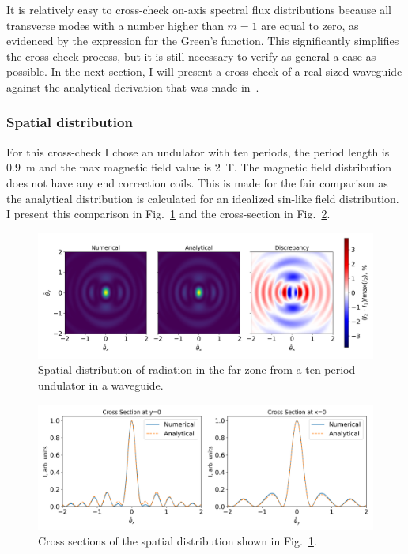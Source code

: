     It is relatively easy to cross-check on-axis spectral flux distributions because all transverse modes with a number higher than $m=1$ are equal to zero, as evidenced by the expression for the Green's function. This significantly simplifies the cross-check process, but it is still necessary to verify as general a case as possible. In the next section, I will present a cross-check of a real-sized waveguide against the analytical derivation that was made in~.
    
\subsubsection{Spatial distribution}
    For this cross-check I chose an undulator with ten periods, the period length is $0.9$~m and the max magnetic field value is $2$~T. The magnetic field distribution does not have any end correction coils. This is made for the fair comparison as the analytical distribution is calculated for an idealized sin-like field distribution. I present this comparison in Fig.~\ref{Fig:pipe_check_2D} and the cross-section in Fig.~\ref{Fig:pipe_check_1D}.
    \begin{figure}[p]
    	\centering
        \includegraphics[width=0.99\linewidth]{content/images/5_THz_Source/pipe_check_2D.png}
        \captionsetup{justification=centering}
        \caption{Spatial distribution of radiation in the far zone from a ten period undulator in a waveguide.}
        \label{Fig:pipe_check_2D}
    \end{figure}
    \begin{figure}[p]
    	\centering
        \includegraphics[width=0.99\linewidth]{content/images/5_THz_Source/pipe_check_1D.png}
        \captionsetup{justification=centering}
        \caption{Cross sections of the spatial distribution shown in Fig.~\ref{Fig:pipe_check_2D}.}
        \label{Fig:pipe_check_1D}
    \end{figure}

